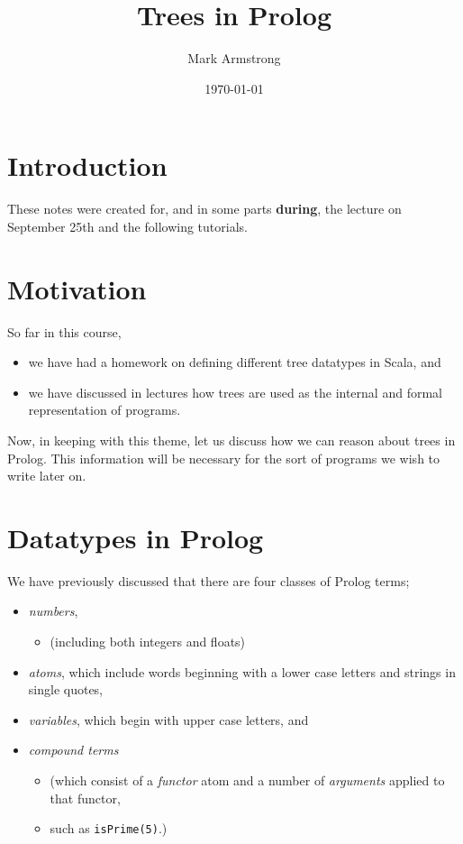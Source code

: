 \documentclass[11pt]{article}
\author{Mark Armstrong}
\date{\today}
\title{Trees in Prolog}
\begin{document}
\maketitle
\tableofcontents


\section{Introduction}
\label{sec:orgefa0545}
These notes were created for, and in some parts \textbf{during},
the lecture on September 25th and the following tutorials.

\section{Motivation}
\label{sec:orgdd52aa2}
So far in this course,
\begin{itemize}
\item we have had a homework on defining different tree datatypes
in Scala, and
\item we have discussed in lectures how trees are used
as the internal and formal representation of programs.
\end{itemize}

Now, in keeping with this theme, let us discuss
how we can reason about trees in Prolog.
This information will be necessary for the sort of programs
we wish to write later on.

\section{Datatypes in Prolog}
\label{sec:orge040fec}
We have previously discussed that there are
four classes of Prolog terms;
\begin{itemize}
\item \emph{numbers},
\begin{itemize}
\item (including both integers and floats)
\end{itemize}
\item \emph{atoms}, which include
words beginning with a lower case letters
and strings in single quotes,
\item \emph{variables}, which begin with upper case letters, and
\item \emph{compound terms}
\begin{itemize}
\item (which consist of a \emph{functor} atom and a number
of \emph{arguments} applied to that functor,
\item such as \texttt{isPrime(5)}.)
\end{itemize}
\end{itemize}
\end{document}
